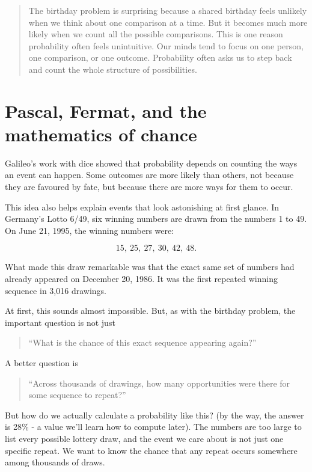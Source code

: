 \documentclass[
  letterpaper,
  DIV=11,
  numbers=noendperiod]{scrreprt}
\begin{document}
\begin{quote}
The birthday problem is surprising because a shared birthday feels
unlikely when we think about one comparison at a time. But it becomes
much more likely when we count all the possible comparisons. This is one
reason probability often feels unintuitive. Our minds tend to focus on
one person, one comparison, or one outcome. Probability often asks us to
step back and count the whole structure of possibilities.
\end{quote}

\section{Pascal, Fermat, and the mathematics of
chance}\label{pascal-fermat-and-the-mathematics-of-chance}

Galileo's work with dice showed that probability depends on counting the
ways an event can happen. Some outcomes are more likely than others, not
because they are favoured by fate, but because there are more ways for
them to occur.

This idea also helps explain events that look astonishing at first
glance. In Germany's Lotto 6/49, six winning numbers are drawn from the
numbers 1 to 49. On June 21, 1995, the winning numbers were:

\[
15,\ 25,\ 27,\ 30,\ 42,\ 48.
\]

What made this draw remarkable was that the exact same set of numbers
had already appeared on December 20, 1986. It was the first repeated
winning sequence in 3,016 drawings.

At first, this sounds almost impossible. But, as with the birthday
problem, the important question is not just

\begin{quote}
``What is the chance of this exact sequence appearing again?''
\end{quote}

A better question is

\begin{quote}
``Across thousands of drawings, how many opportunities were there for
some sequence to repeat?''
\end{quote}

But how do we actually calculate a probability like this? (by the way,
the answer is 28\% - a value we'll learn how to compute later). The
numbers are too large to list every possible lottery draw, and the event
we care about is not just one specific repeat. We want to know the
chance that any repeat occurs somewhere among thousands of draws.
\end{document}
